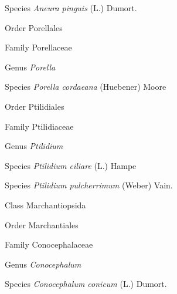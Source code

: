 \documentclass[9pt, article]{memoir}
\begin{document}
\begin{multicols}{2}
\vspace{6pt}\noindent\hspace{36pt}Species \textit{Aneura pinguis} (L.) Dumort.


\vspace{6pt}\noindent\hspace{18pt}Order Porellales


\vspace{6pt}\noindent\hspace{24pt}Family Porellaceae


\vspace{6pt}\noindent\hspace{30pt}Genus \textit{Porella}


\vspace{6pt}\noindent\hspace{36pt}Species \textit{Porella cordaeana} (Huebener) Moore


\vspace{6pt}\noindent\hspace{18pt}Order Ptilidiales


\vspace{6pt}\noindent\hspace{24pt}Family Ptilidiaceae


\vspace{6pt}\noindent\hspace{30pt}Genus \textit{Ptilidium}


\vspace{6pt}\noindent\hspace{36pt}Species \textit{Ptilidium ciliare} (L.) Hampe


\vspace{6pt}\noindent\hspace{36pt}Species \textit{Ptilidium pulcherrimum} (Weber) Vain.


\vspace{6pt}\noindent\hspace{12pt}Class Marchantiopsida


\vspace{6pt}\noindent\hspace{18pt}Order Marchantiales


\vspace{6pt}\noindent\hspace{24pt}Family Conocephalaceae


\vspace{6pt}\noindent\hspace{30pt}Genus \textit{Conocephalum}


\vspace{6pt}\noindent\hspace{36pt}Species \textit{Conocephalum conicum} (L.) Dumort.



\end{multicols}
\end{document}
